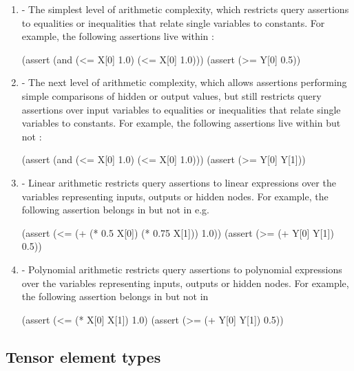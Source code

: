 \begin{enumerate}
\item \textbf{\bnd{}} - 
The simplest level of arithmetic complexity, which restricts query assertions to equalities or inequalities that relate single variables to constants. For example, the following assertions live within \bnd{}:

\begin{code}[style=lbnf]
(assert (and (<= X[0] 1.0) (<= X[0] 1.0)))
(assert (>= Y[0] 0.5))
\end{code}

\item \textbf{\cout{}} - 
The next level of arithmetic complexity, which allows assertions performing simple comparisons of hidden or output values, but still restricts query assertions over input variables to equalities or inequalities that relate single variables to constants. For example, the following assertions live within \cout{} but not \bnd{}:

\begin{code}[style=lbnf]
(assert (and (<= X[0] 1.0) (<= X[0] 1.0)))
(assert (>= Y[0] Y[1]))
\end{code}

\item \textbf{\lin{}} - Linear arithmetic restricts query assertions to linear expressions over the variables representing inputs, outputs or hidden nodes. For example, the following assertion belongs in \lin{} but not in \cout{} e.g. 

\begin{code}[style=lbnf]
(assert (<= (+ (* 0.5 X[0]) (* 0.75 X[1])) 1.0))
(assert (>= (+ Y[0] Y[1]) 0.5))
\end{code}

\item \textbf{\poly{}} - Polynomial arithmetic restricts query assertions to polynomial expressions over the variables representing inputs, outputs or hidden nodes. 
For example, the following assertion belongs in \poly{} but not in \lin{}

\begin{code}[style=lbnf]
(assert (<= (* X[0] X[1]) 1.0)
(assert (>= (+ Y[0] Y[1]) 0.5))
\end{code}

\end{enumerate}


\subsection{Tensor element types}
\label{sec:element-types}

